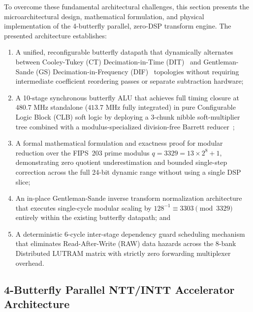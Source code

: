 To overcome these fundamental architectural challenges, this section presents the microarchitectural design, mathematical formulation, and physical implementation of the 4-butterfly parallel, zero-DSP transform engine. The presented architecture establishes:
\begin{enumerate}
    \item A unified, reconfigurable butterfly datapath that dynamically alternates between Cooley-Tukey (CT) Decimation-in-Time (DIT)~\cite{cooley1965} and Gentleman-Sande (GS) Decimation-in-Frequency (DIF)~\cite{gentleman1966} topologies without requiring intermediate coefficient reordering passes or separate subtraction hardware;
    \item A 10-stage synchronous butterfly ALU that achieves full timing closure at $480.7\text{ MHz}$ standalone ($413.7\text{ MHz}$ fully integrated) in pure Configurable Logic Block (CLB) soft logic by deploying a 3-chunk nibble soft-multiplier tree combined with a modulus-specialized division-free Barrett reducer~\cite{barrett1986};
    \item A formal mathematical formulation and exactness proof for modular reduction over the FIPS~203 prime modulus $q = 3329 = 13 \times 2^8 + 1$, demonstrating zero quotient underestimation and bounded single-step correction across the full 24-bit dynamic range without using a single DSP slice;
    \item An in-place Gentleman-Sande inverse transform normalization architecture that executes single-cycle modular scaling by $128^{-1} \equiv 3303 \pmod{3329}$ entirely within the existing butterfly datapath; and
    \item A deterministic 6-cycle inter-stage dependency guard scheduling mechanism that eliminates Read-After-Write (RAW) data hazards across the 8-bank Distributed LUTRAM matrix with strictly zero forwarding multiplexer overhead.
\end{enumerate}

\subsection{4-Butterfly Parallel NTT/INTT Accelerator Architecture}
\label{sec:ntt_engine}

